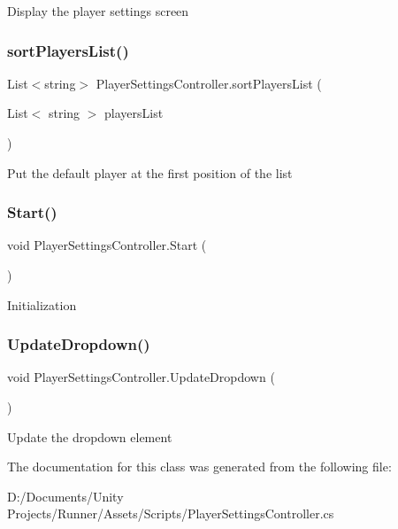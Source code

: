Display the player settings screen \mbox{\label{class_player_settings_controller_aa9ae4f47bc49df25568a835f31bbe194}} 
\subsubsection{\texorpdfstring{sort\+Players\+List()}{sortPlayersList()}}
{\footnotesize\ttfamily List$<$string$>$ Player\+Settings\+Controller.\+sort\+Players\+List (\begin{DoxyParamCaption}\item[{List$<$ string $>$}]{players\+List }\end{DoxyParamCaption})\hspace{0.3cm}{\ttfamily [private]}}

Put the default player at the first position of the list \mbox{\label{class_player_settings_controller_aa62d29bfebe427df3951c7ff39a74d32}} 
\subsubsection{\texorpdfstring{Start()}{Start()}}
{\footnotesize\ttfamily void Player\+Settings\+Controller.\+Start (\begin{DoxyParamCaption}{ }\end{DoxyParamCaption})\hspace{0.3cm}{\ttfamily [private]}}

Initialization \mbox{\label{class_player_settings_controller_a69fa150b52c191b94d02906ce506b1d0}} 
\subsubsection{\texorpdfstring{Update\+Dropdown()}{UpdateDropdown()}}
{\footnotesize\ttfamily void Player\+Settings\+Controller.\+Update\+Dropdown (\begin{DoxyParamCaption}{ }\end{DoxyParamCaption})}

Update the dropdown element 

The documentation for this class was generated from the following file\+:\begin{DoxyCompactItemize}
\item 
D\+:/\+Documents/\+Unity Projects/\+Runner/\+Assets/\+Scripts/Player\+Settings\+Controller.\+cs\end{DoxyCompactItemize}
